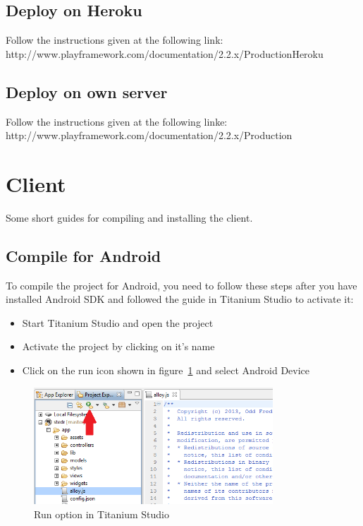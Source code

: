 \documentclass[11pt]{book}
\begin{document}
\subsection{Deploy on Heroku}
Follow the instructions given at the following link:\\
http://www.playframework.com/documentation/2.2.x/ProductionHeroku

\subsection{Deploy on own server}
Follow the instructions given at the following linke:\\
http://www.playframework.com/documentation/2.2.x/Production

\section{Client}
Some short guides for compiling and installing the client.

\subsection{Compile for Android}
To compile the project for Android, you need to follow these steps after you have installed Android SDK and followed the guide in Titanium Studio to activate it:

\begin{itemize}
    \item Start Titanium Studio and open the project
    \item Activate the project by clicking on it's name
    \item Click on the run icon shown in figure~\ref{fig:appendix_documentation_compile} and select Android Device
\end{itemize}

\begin{figure}[H]
    \centering
    \includegraphics[width=0.8\textwidth]{Figures/Appendix/compile.png}
    \caption{Run option in Titanium Studio}
    \label{fig:appendix_documentation_compile}
\end{figure}
\end{document}
